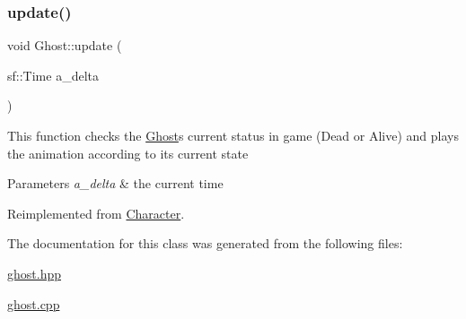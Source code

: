 \subsubsection{\texorpdfstring{update()}{update()}}
{\footnotesize\ttfamily void Ghost\+::update (\begin{DoxyParamCaption}\item[{sf\+::\+Time}]{a\+\_\+delta }\end{DoxyParamCaption})\hspace{0.3cm}{\ttfamily [virtual]}}

This function checks the \hyperlink{class_ghost}{Ghost}\textquotesingle{}s current status in game (Dead or Alive) and plays the animation according to it\textquotesingle{}s current state


\begin{DoxyParams}{Parameters}
{\em a\+\_\+delta} & the current time \\
\hline
\end{DoxyParams}


Reimplemented from \hyperlink{class_character_a89b72b507971ba8648909980d045ed06}{Character}.



The documentation for this class was generated from the following files\+:\begin{DoxyCompactItemize}
\item 
\hyperlink{ghost_8hpp}{ghost.\+hpp}\item 
\hyperlink{ghost_8cpp}{ghost.\+cpp}\end{DoxyCompactItemize}
